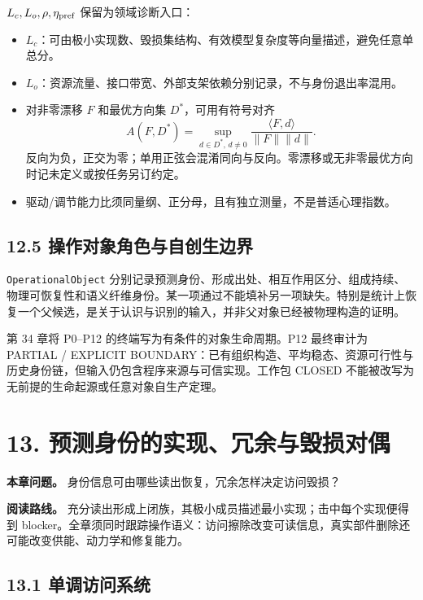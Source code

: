 \documentclass[
  11pt,
  oneside]{book}
\providecommand{\tightlist}{%
  \setlength{\itemsep}{0pt}\setlength{\parskip}{0pt}}
\begin{document}
\(L_c,L_o,\rho,\eta_{\rm pref}\) 保留为领域诊断入口：

\begin{itemize}
\tightlist
\item
  \(L_c\)：可由极小实现数、毁损集结构、有效模型复杂度等向量描述，避免任意单总分。
\item
  \(L_o\)：资源流量、接口带宽、外部支架依赖分别记录，不与身份退出率混用。
\item
  对非零漂移 \(F\) 和最优方向集 \(D^*\)，可用有符号对齐 \[A(F,D^*)=\sup_{d\in D^*,\,d\ne0}
  \frac{\langle F,d\rangle}{\|F\|\|d\|}.\] 反向为负，正交为零；单用正弦会混淆同向与反向。零漂移或无非零最优方向时记未定义或按任务另订约定。
\item
  驱动/调节能力比须同量纲、正分母，且有独立测量，不是普适心理指数。
\end{itemize}

\section{12.5 操作对象角色与自创生边界}\label{ux64cdux4f5cux5bf9ux8c61ux89d2ux8272ux4e0eux81eaux521bux751fux8fb9ux754c}

\nolinkurl{OperationalObject} 分别记录预测身份、形成出处、相互作用区分、组成持续、物理可恢复性和语义纤维身份。某一项通过不能填补另一项缺失。特别是统计上恢复一个父候选，是关于认识与识别的输入，并非父对象已经被物理构造的证明。

第 34 章将 P0--P12 的终端写为有条件的对象生命周期。P12 最终审计为 PARTIAL / EXPLICIT BOUNDARY：已有组织构造、平均稳态、资源可行性与历史身份链，但输入仍包含程序来源与可信实现。工作包 CLOSED 不能被改写为无前提的生命起源或任意对象自生产定理。

\chapter{13. 预测身份的实现、冗余与毁损对偶}\label{ch-13}

\textbf{本章问题。} 身份信息可由哪些读出恢复，冗余怎样决定访问毁损？

\textbf{阅读路线。} 充分读出形成上闭族，其极小成员描述最小实现；击中每个实现便得到 blocker。全章须同时跟踪操作语义：访问擦除改变可读信息，真实部件删除还可能改变供能、动力学和修复能力。

\section{13.1 单调访问系统}\label{ux5355ux8c03ux8bbfux95eeux7cfbux7edf}
\end{document}
